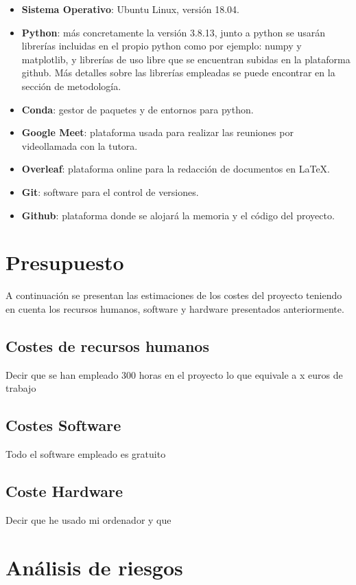 \begin{itemize}
    \item \textbf{Sistema Operativo}: Ubuntu Linux, versión 18.04.
    \item \textbf{Python}: más concretamente la versión 3.8.13, junto a python se usarán librerías incluidas en el propio python como por ejemplo: numpy y matplotlib, y librerías de uso libre que se encuentran subidas en la plataforma github. Más detalles sobre las librerías empleadas se puede encontrar en la sección de metodología.
    \item \textbf{Conda}: gestor de paquetes y de entornos para python.
    \item \textbf{Google Meet}: plataforma usada para realizar las reuniones por videollamada con la tutora.
    \item \textbf{Overleaf}: plataforma online para la redacción de documentos en \LaTeX.
    \item \textbf{Git}: software para el control de versiones. 
    \item \textbf{Github}: plataforma donde se alojará la memoria y el código del proyecto.
\end{itemize}

\section{Presupuesto}
A continuación se presentan las estimaciones de los costes del proyecto teniendo en cuenta los recursos humanos, software y hardware presentados anteriormente. 

\subsection{Costes de recursos humanos}
Decir que se han empleado 300 horas en el proyecto lo que equivale a x euros de trabajo
\subsection{Costes Software}
Todo el software empleado es gratuito
\subsection{Coste Hardware}
Decir que he usado mi ordenador y que 

\section{Análisis de riesgos}


